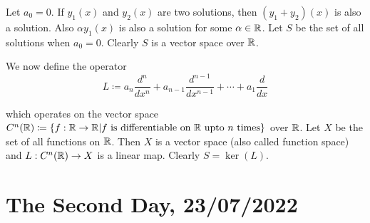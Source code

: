 \documentclass{amsart}
\begin{document}
Let $a_0=0$. If $y_1(x)$ and $y_2(x)$ are two solutions, then $(y_1+y_2)(x)$ is also a solution. Also $\alpha y_1(x)$ is also a solution for some $\alpha \in \mathbb{R}$. Let $S$ be the set of all solutions when $a_0 = 0$. Clearly $S$ is a vector space over $\mathbb{R}$.

We now define the operator 
\begin{displaymath}
L \coloneqq a_n \frac{d^n}{dx^n} + a_{n-1} \frac{d^{n-1}}{dx^{n-1}} + \cdots + a_1 \frac{d}{dx}
\end{displaymath}

which operates on the vector space $C^n(\mathbb{R})\coloneqq \{f:\mathbb{R} \to \mathbb{R} | f \text{ is differentiable on } \mathbb{R} \text{ upto } n \text{ times}\}$ over $\mathbb{R}$. Let $X$ be the set of all functions on $\mathbb{R}$. Then $X$ is a vector space (also called function space) and $L:C^n(\mathbb{R}) \to X$ is a linear map. Clearly $S = \ker(L)$.


\section{The Second Day, 23/07/2022}
\end{document}
